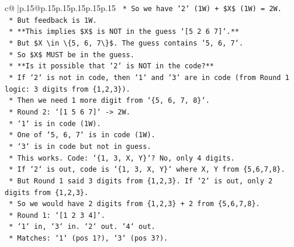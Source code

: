 \documentclass{article}
\begin{document}
{\begin{supertabular}{c@{$\;$}|p{.15\linewidth}@{}p{.15\linewidth}p{.15\linewidth}p{.15\linewidth}p{.15\linewidth}p{.15\linewidth}}
{{{\texttt{                                *   So we have `2` (1W) + \$X\$ (1W) = 2W.} \\
\texttt{                                *   But feedback is 1W.} \\
\texttt{                                *   **This implies \$X\$ is NOT in the guess `{[}5 2 6 7{]}`.**} \\
\texttt{                                *   But \$X \textbackslash{}in \textbackslash{}\{5, 6, 7\textbackslash{}\}\$. The guess contains `5, 6, 7`.} \\
\texttt{                                *   So \$X\$ MUST be in the guess.} \\
\texttt{                                *   **Is it possible that `2` is NOT in the code?**} \\
\texttt{                                    *   If `2` is not in code, then `1` and `3` are in code (from Round 1 logic: 3 digits from \{1,2,3\}).} \\
\texttt{                                    *   Then we need 1 more digit from `\{5, 6, 7, 8\}`.} \\
\texttt{                                    *   Round 2: `{[}1 5 6 7{]}` {-}> 2W.} \\
\texttt{                                        *   `1` is in code (1W).} \\
\texttt{                                        *   One of `5, 6, 7` is in code (1W).} \\
\texttt{                                        *   `3` is in code but not in guess.} \\
\texttt{                                        *   This works. Code: `\{1, 3, X, Y\}`? No, only 4 digits.} \\
\texttt{                                        *   If `2` is out, code is `\{1, 3, X, Y\}` where X, Y from \{5,6,7,8\}.} \\
\texttt{                                        *   But Round 1 said 3 digits from \{1,2,3\}. If `2` is out, only 2 digits from \{1,2,3\}.} \\
\texttt{                                        *   So we would have 2 digits from \{1,2,3\} + 2 from \{5,6,7,8\}.} \\
\texttt{                                        *   Round 1: `{[}1 2 3 4{]}`.} \\
\texttt{                                            *   `1` in, `3` in. `2` out. `4` out.} \\
\texttt{                                            *   Matches: `1` (pos 1?), `3` (pos 3?).} \\
}}}
\end{supertabular}}
\end{document}
